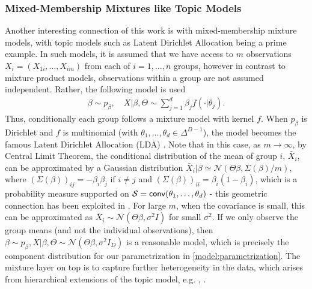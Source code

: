 \documentclass[bj,authoryear]{imsart}
\theoremstyle{plain}
\theoremstyle{remark}
\def\cN{\mathcal{N}}
\def\cS{\mathcal{S}}
\def\conv{{\sf conv}}
\begin{document}
\begin{appendix}
\subsubsection*{Mixed-Membership Mixtures like Topic Models}
Another interesting connection of this work is with mixed-membership mixture models, with topic models such as Latent Dirichlet Allocation \cite{blei2012probabilistic} being a prime example. In such models, it is assumed that we have access to $m$  observations $X_i=(X_{1i},\dots,X_{im})$ from each of $i=1,\dots,n$ groups, however in contrast to mixture product models, observations within a group are not assumed independent. Rather, the following model is used
\begin{equation}
    \begin{aligned}
        \beta \sim p_{\beta}, \quad X | \beta, \Theta \sim \sum_{j=1}^d \beta_j f(\cdot|\theta_j).
    \end{aligned}
\end{equation}
Thus, conditionally each group follows a mixture model with kernel $f$. When $p_{\beta}$ is Dirichlet and $f$ is multinomial (with $\theta_1,\dots,\theta_d\in\Delta^{D-1}$), the model becomes the famous Latent Dirichlet Allocation (LDA) \cite{blei2003latent}.  Note that in this case, as $m\to\infty$, by Central Limit Theorem, the conditional distribution of the mean of group $i$, $\bar{X}_i$, can be approximated by a Gaussian distribution $\bar{X}_i |\beta \simeq \cN(\Theta\beta, \Sigma(\beta)/m)$, where $(\Sigma(\beta))_{ij} = -\beta_i\beta_j$ if $i\neq j$ and $(\Sigma(\beta))_{ii} = \beta_i(1-\beta_i)$, which is a probability measure supported on $\cS=\conv(\theta_1,\dots,\theta_d)$ - this geometric connection has been exploited in \cite{nguyen2015posterior}. For large $m$, when the covariance is small, this can be approximated as $\bar{X}_i \sim \cN(\Theta\beta, \sigma^2 I)$ for small $\sigma^2$. If we only observe the group means (and not the individual observations), then $\beta\sim p_{\beta}, X|\beta,\Theta\sim \cN(\Theta\beta,\sigma^2 I_D)$ is a reasonable model, which is precisely the component distribution for our parametrization in \eqref{model:parametrization}. The mixture layer on top is to capture further heterogeneity in the data, which arises from hierarchical extensions of the topic model, e.g. \cite{griffiths2003hierarchical}, \cite{chakraborty2024learning}.



\end{appendix}
\end{document}
